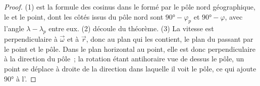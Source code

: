 \begin{proof}
(1) est la formule des cosinus dans le  formé par le pôle nord
géographique, le  et le point, dont les côtés issus du pôle nord sont
$\ang{90} - \varphi_p$ et $\ang{90} - \varphi$, avec l'angle
$\lambda - \lambda_p$ entre eux. (2) découle du théorème. (3) La
vitesse est perpendiculaire à $\vec\omega$ et à $\vec r$, donc au plan qui
les contient, le plan du  passant par le point et le pôle. Dans
le plan horizontal au point, elle est donc perpendiculaire à la
direction du pôle~; la rotation étant antihoraire vue de dessus le
pôle, un point se déplace à droite de la direction dans laquelle il voit le pôle,
ce qui ajoute \ang{90} à l'.
\end{proof}

